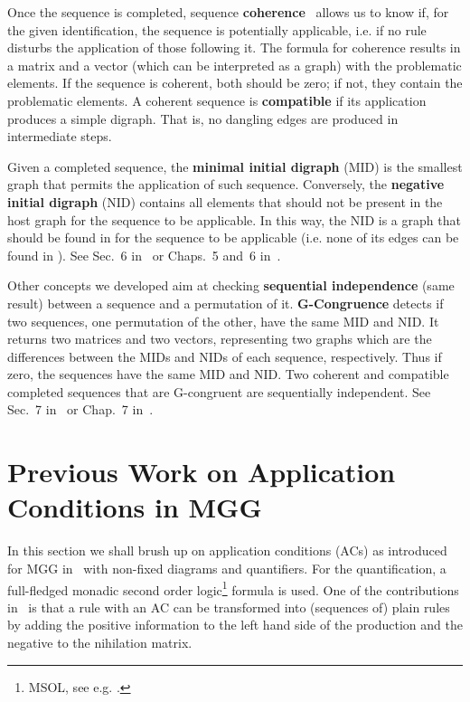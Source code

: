 \documentclass{fundam}
\begin{document}
Once the sequence is completed, sequence
\textbf{coherence}~\cite{JuanPP_1, MGGBook, MGGCombinatorics}
allows us to know if, for the given identification, the sequence is
potentially applicable, i.e. if no rule disturbs the application of
those following it. The formula for coherence results in a matrix and
a vector (which can be interpreted as a graph) with the problematic
elements. If the sequence is coherent, both should be zero; if not,
they contain the problematic elements. A coherent sequence is
\textbf{compatible} if its application produces a simple digraph. That
is, no dangling edges are produced in intermediate steps.

Given a completed sequence, the \textbf{minimal initial digraph} (MID)
is the smallest graph that permits the application of such
sequence. Conversely, the \textbf{negative initial digraph} (NID)
contains all elements that should not be present in the host graph for
the sequence to be applicable. In this way, the NID is a graph that
should be found in  for the sequence to be applicable
(i.e. none of its edges can be found in ). See Sec.~6
in~\cite{MGGCombinatorics} or Chaps.~5 and~6 in~\cite{MGGBook}.

Other concepts we developed aim at checking \textbf{sequential
  independence} (same result) between a sequence and a permutation of
it. \textbf{G-Congruence} detects if two sequences, one permutation of
the other, have the same MID and NID. It returns two matrices and two
vectors, representing two graphs which are the differences between the
MIDs and NIDs of each sequence, respectively. Thus if zero, the
sequences have the same MID and NID. Two coherent and compatible
completed sequences that are G-congruent are sequentially
independent. See Sec.~7 in~\cite{MGGCombinatorics} or Chap.~7
in~\cite{MGGBook}.

\section{Previous Work on Application Conditions in MGG}
\label{sec:previous}


In this section we shall brush up on application conditions (ACs) as
introduced for MGG in~\cite{MGGfundamenta} with non-fixed diagrams and
quantifiers. For the quantification, a full-fledged monadic second
order logic\footnote{MSOL, see e.g. \cite{Courcelle}.} formula is
used. One of the contributions in~\cite{MGGfundamenta} is that a
rule with an AC can be transformed into (sequences of) plain rules by
adding the positive information to the left hand side of the
production and the negative to the nihilation matrix.
\end{document}
